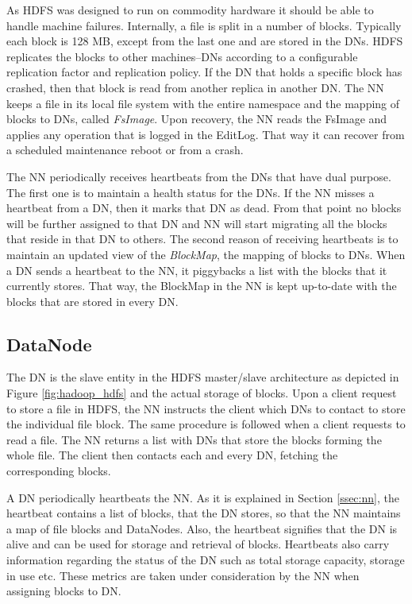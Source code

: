As HDFS was designed to run on commodity
hardware it should be able to handle machine failures. Internally, a
file is split in a number of blocks. Typically each block is 128 MB,
except from the last one and are stored
in the DNs. HDFS replicates the blocks to other machines--DNs
according to a configurable replication factor and replication policy.
If the DN that holds a specific block has crashed, then that block is read from
another replica in another DN.
The NN keeps a file in its local file system with the entire namespace
and the mapping of blocks to DNs, called \emph{FsImage}. Upon
recovery, the NN reads the FsImage and applies any operation that is
logged in the EditLog. That way it can recover from a scheduled
maintenance reboot or from a crash.

The NN periodically receives heartbeats from the DNs that have dual
purpose. The first one is to maintain a health status for the DNs. If
the NN misses a heartbeat from a DN, then it marks that DN as
dead. From that point no blocks will be further assigned to that DN
and NN will start migrating all the blocks that reside in that DN to
others. The second reason of receiving heartbeats is to maintain an
updated view of the \emph{BlockMap}, the mapping of blocks to
DNs. When a DN sends a heartbeat to the NN, it piggybacks a list with
the blocks that it currently stores. That way, the BlockMap in the NN
is kept up-to-date with the blocks that are stored in every DN.

\subsection{DataNode}
\label{ssec:dn}

The DN is the slave entity in the HDFS master/slave architecture as depicted in
Figure \ref{fig:hadoop_hdfs} and the actual storage of blocks. Upon a
client request to store a file in HDFS, the NN instructs the
client which DNs to contact to store the individual file block. The
same procedure is followed when a client requests to read a file. The
NN returns a list with DNs that store the blocks forming the whole
file. The client then contacts each and every DN, fetching the
corresponding blocks.

A DN periodically heartbeats the NN. As it is explained in Section
\ref{ssec:nn}, the heartbeat contains a list of blocks, that the DN
stores, so that the NN maintains a map of file
blocks and DataNodes. Also, the heartbeat signifies that the DN is
alive and can be used for storage and retrieval of blocks. Heartbeats
also carry information regarding the status of the DN such as total
storage capacity, storage in use etc. These metrics are taken under
consideration by the NN when assigning blocks to DN.

